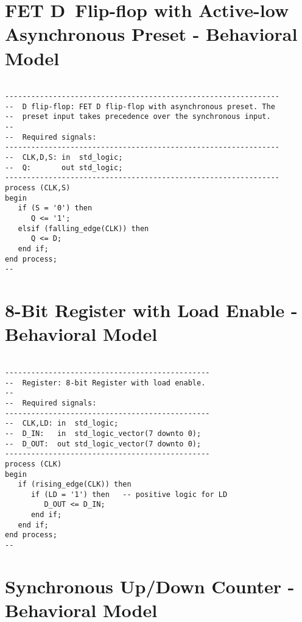 \section{FET D~Flip-flop with Active-low Asynchronous Preset - Behavioral Model}

\noindent
\begin{minipage}{0.99\linewidth}
\begin{lstlisting}

---------------------------------------------------------------
--  D flip-flop: FET D flip-flop with asynchronous preset. The
--  preset input takes precedence over the synchronous input.
--
--  Required signals:
---------------------------------------------------------------
--  CLK,D,S: in  std_logic;
--  Q:       out std_logic;
---------------------------------------------------------------
process (CLK,S)
begin
   if (S = '0') then
      Q <= '1';
   elsif (falling_edge(CLK)) then
      Q <= D;
   end if;
end process;
--
\end{lstlisting}
\end{minipage}

\section{8-Bit Register with Load Enable - Behavioral Model}

\noindent
\begin{minipage}{0.99\linewidth}
\begin{lstlisting}

-----------------------------------------------
--  Register: 8-bit Register with load enable.
--
--  Required signals:
-----------------------------------------------
--  CLK,LD: in  std_logic;
--  D_IN:   in  std_logic_vector(7 downto 0);
--  D_OUT:  out std_logic_vector(7 downto 0);
-----------------------------------------------
process (CLK)
begin
   if (rising_edge(CLK)) then
      if (LD = '1') then   -- positive logic for LD
         D_OUT <= D_IN;
      end if;
   end if;
end process;
--
\end{lstlisting}
\end{minipage}

\section{Synchronous Up/Down Counter - Behavioral Model}

